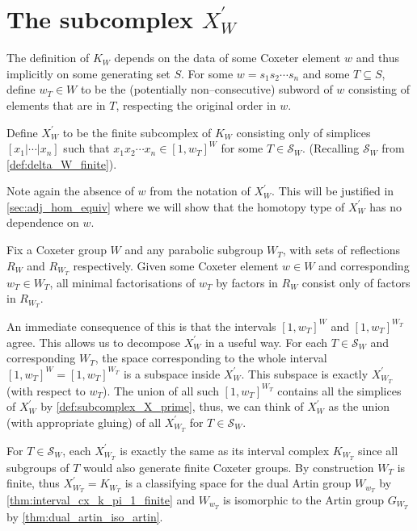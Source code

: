 \documentclass[class=article, crop=false]{standalone}
\begin{document}
\section{The subcomplex \texorpdfstring{$X_{W}^\prime$}{X W Prime}}
The definition of $K_{W}$ depends on the data of some Coxeter element $w$ and thus implicitly on some generating set $S$. For some $w = s_1s_2\cdots s_n$ and some $T\subseteq S$, define $w_T\in W$ to be the (potentially non--consecutive) subword of $w$ consisting of elements that are in $T$, respecting the original order in $w$. 
\begin{definition}
    Define $X_{W}^\prime$ to be the finite subcomplex of $K_{W}$ consisting only of simplices $[x_1 | \cdots | x_n]$ such that $x_1x_2\cdots x_n \in [1,w_T]^W$ for some $T \in \mathcal{S}_W$. (Recalling $\mathcal{S}_W$ from \cref{def:delta_W_finite}).
    \label{def:subcomplex_X_prime}
\end{definition}
Note again the absence of $w$ from the notation of $X^\prime_W$. This will be justified in \cref{sec:adj_hom_equiv} where we will show that the homotopy type of $X_W^\prime$ has no dependence on $w$.

\begin{lemma}[{\hspace{1sp}\cite[Lemma 5.2]{paolini_salvetti_kpi1_2021}}]
    Fix a Coxeter group $W$ and any parabolic subgroup $W_T$, with sets of reflections $R_W$ and $R_{W_T}$ respectively. Given some Coxeter element $w \in W$ and corresponding $w_T \in W_T$, all minimal factorisations of $w_T$ by factors in $R_W$ consist only of factors in $R_{W_T}$.
    \label{lem:all_decompositions_of_w_T_are_R}
\end{lemma}
An immediate consequence of this is that the intervals $[1,w_T]^W$ and $[1,w_T]^{W_T}$ agree. This allows us to decompose $X^\prime_W$ in a useful way. For each $T \in \mathcal{S}_W$ and corresponding $W_T$, the space corresponding to the whole interval $[1, w_T]^W=[1,w_T]^{W_T}$ is a subspace inside $X^\prime_W$. This subspace is exactly $X^\prime_{W_T}$ (with respect to $w_T$). The union of all such $[1,w_T]^{W_T}$ contains all the simplices of $X_W^\prime$ by \cref{def:subcomplex_X_prime}, thus, we can think of $X^\prime_W$ as the union (with appropriate gluing) of all $X^\prime_{W_T}$ for $T \in \mathcal{S}_W$.

For $T \in \mathcal{S}_W$, each $X^\prime_{W_T}$ is exactly the same as its interval complex $K_{{W_T}}$ since all subgroups of $T$ would also generate finite Coxeter groups. By construction $W_T$ is finite, thus $X^\prime_{W_T} = K_{W_T}$ is a classifying space for the dual Artin group $W_{w_T}$ by \cref{thm:interval_cx_k_pi_1_finite} and $W_{w_T}$ is isomorphic to the Artin group $G_{W_T}$ by \cref{thm:dual_artin_iso_artin}.
\end{document}
